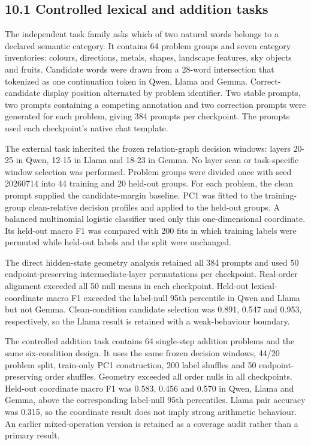\documentclass[10pt]{article}
\begin{document}
\subsection*{10.1 Controlled lexical and addition tasks}

The independent task family asks which of two natural words belongs to a declared semantic category. It contains 64 problem groups and seven category inventories: colours, directions, metals, shapes, landscape features, sky objects and fruits. Candidate words were drawn from a 28-word intersection that tokenized as one continuation token in Qwen, Llama and Gemma. Correct-candidate display position alternated by problem identifier. Two stable prompts, two prompts containing a competing annotation and two correction prompts were generated for each problem, giving 384 prompts per checkpoint. The prompts used each checkpoint's native chat template.

The external task inherited the frozen relation-graph decision windows: layers 20-25 in Qwen, 12-15 in Llama and 18-23 in Gemma. No layer scan or task-specific window selection was performed. Problem groups were divided once with seed 20260714 into 44 training and 20 held-out groups. For each problem, the clean prompt supplied the candidate-margin baseline. PC1 was fitted to the training-group clean-relative decision profiles and applied to the held-out groups. A balanced multinomial logistic classifier used only this one-dimensional coordinate. Its held-out macro F1 was compared with 200 fits in which training labels were permuted while held-out labels and the split were unchanged.

The direct hidden-state geometry analysis retained all 384 prompts and used 50 endpoint-preserving intermediate-layer permutations per checkpoint. Real-order alignment exceeded all 50 null means in each checkpoint. Held-out lexical-coordinate macro F1 exceeded the label-null 95th percentile in Qwen and Llama but not Gemma. Clean-condition candidate selection was 0.891, 0.547 and 0.953, respectively, so the Llama result is retained with a weak-behaviour boundary.

The controlled addition task contains 64 single-step addition problems and the same six-condition design. It uses the same frozen decision windows, 44/20 problem split, train-only PC1 construction, 200 label shuffles and 50 endpoint-preserving order shuffles. Geometry exceeded all order nulls in all checkpoints. Held-out coordinate macro F1 was 0.583, 0.456 and 0.570 in Qwen, Llama and Gemma, above the corresponding label-null 95th percentiles. Llama pair accuracy was 0.315, so the coordinate result does not imply strong arithmetic behaviour. An earlier mixed-operation version is retained as a coverage audit rather than a primary result.
\end{document}
